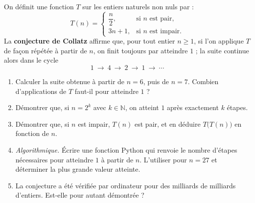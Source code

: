 On définit une fonction $T$ sur les entiers naturels non nuls par :
\[
T(n) =
\begin{cases}
\dfrac{n}{2}, & \text{si } n \text{ est pair,}\\[4pt]
3n + 1, & \text{si } n \text{ est impair.}
\end{cases}
\]
La \textbf{conjecture de Collatz} affirme que, pour tout entier
$n \geqslant 1$, si l'on applique $T$ de façon répétée à partir de $n$, on
finit toujours par atteindre $1$ ; la suite continue alors dans le cycle
\[
1 \ \to\ 4 \ \to\ 2 \ \to\ 1 \ \to\ \cdots
\]
\begin{enumerate}
  \item Calculer la suite obtenue à partir de $n = 6$, puis de $n = 7$.
  Combien d'applications de $T$ faut-il pour atteindre $1$ ?
  \item Démontrer que, si $n = 2^k$ avec $k \in \mathbb{N}$, on atteint $1$
  après exactement $k$ étapes.
  \item Démontrer que, si $n$ est impair, $T(n)$ est pair, et en déduire
  $T\bigl(T(n)\bigr)$ en fonction de $n$.
  \item \emph{Algorithmique.} Écrire une fonction Python qui renvoie le
  nombre d'étapes nécessaires pour atteindre $1$ à partir de $n$. L'utiliser
  pour $n = 27$ et déterminer la plus grande valeur atteinte.
  \item La conjecture a été vérifiée par ordinateur pour des milliards de
  milliards d'entiers. Est-elle pour autant démontrée ?
\end{enumerate}
